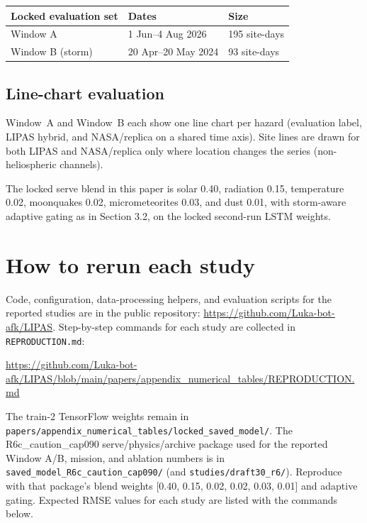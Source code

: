 \begin{center}
\begin{tabular}{@{}lll@{}}
\toprule
Locked evaluation set & Dates & Size \\
\midrule
Window A & 1 Jun--4 Aug 2026 & 195 site-days \\
Window B (storm) & 20 Apr--20 May 2024 & 93 site-days \\
\bottomrule
\end{tabular}
\label{tab:evalwindows}
\end{center}

\subsection*{Line-chart evaluation}
Window~A and Window~B each show one line chart per hazard (evaluation label, LIPAS hybrid, and NASA/replica on a shared time axis). Site lines are drawn for both LIPAS and NASA/replica only where location changes the series (non-heliospheric channels).

The locked serve blend in this paper is solar 0.40, radiation 0.15, temperature 0.02, moonquakes 0.02, micrometeorites 0.03, and dust 0.01, with storm-aware adaptive gating as in Section 3.2, on the locked second-run LSTM weights.

\section{How to rerun each study}

Code, configuration, data-processing helpers, and evaluation scripts for the reported studies are in the public repository: \url{https://github.com/Luka-bot-afk/LIPAS}. Step-by-step commands for each study are collected in \texttt{REPRODUCTION.md}:

\url{https://github.com/Luka-bot-afk/LIPAS/blob/main/papers/appendix_numerical_tables/REPRODUCTION.md}

The train-2 TensorFlow weights remain in \texttt{papers/appendix\_numerical\_tables/locked\_saved\_model/}. The R6c\_caution\_cap090 serve/physics/archive package used for the reported Window A/B, mission, and ablation numbers is in \texttt{saved\_model\_R6c\_caution\_cap090/} (and \texttt{studies/draft30\_r6/}). Reproduce with that package's blend weights [0.40, 0.15, 0.02, 0.02, 0.03, 0.01] and adaptive gating. Expected RMSE values for each study are listed with the commands below.

